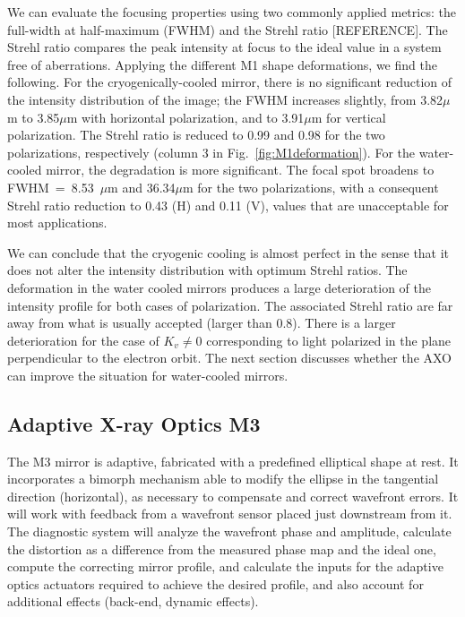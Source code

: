 \documentclass[preprint]{iucr}
\begin{document}
We can evaluate the focusing properties using two commonly applied metrics: the full-width at half-maximum (FWHM) and the Strehl ratio [REFERENCE]. The Strehl ratio compares the peak intensity at focus to the ideal value in a system free of aberrations. Applying the different M1 shape deformations, we find the following. For the cryogenically-cooled mirror, there is no significant reduction of the intensity distribution of the image; the FWHM increases slightly, from 3.82$\mu$m to 3.85$\mu$m with horizontal polarization, and to 3.91$\mu$m for vertical polarization. The Strehl ratio is reduced to 0.99 and 0.98 for the two polarizations, respectively (column 3 in Fig.~\ref{fig:M1deformation}). For the water-cooled mirror, the degradation is more significant. The focal spot broadens to FWHM~=~8.53~$\mu$m and 36.34$\mu$m for the two polarizations, with a consequent Strehl ratio reduction to 0.43 (H) and 0.11 (V), values that are unacceptable for most applications. 

We can conclude that the cryogenic cooling is almost perfect in the sense that it does not alter the intensity distribution with optimum Strehl ratios. The deformation in the water cooled mirrors produces a large deterioration of the intensity profile for both cases of polarization. The associated Strehl ratio are far away from what is usually accepted (larger than 0.8). There is a larger deterioration for the case of $K_v\ne 0$ corresponding to light polarized in the plane perpendicular to the electron orbit. The next section discusses whether the AXO can improve the situation for water-cooled mirrors.    

\subsection{Adaptive X-ray Optics M3}

The M3 mirror is adaptive, fabricated with a predefined elliptical shape at rest. It incorporates a bimorph mechanism able to modify the ellipse in the tangential direction (horizontal), as necessary to compensate and correct wavefront errors. It will work with feedback from a wavefront sensor placed just downstream from it. The diagnostic system will analyze the wavefront phase and amplitude, calculate the distortion as a difference from the measured phase map and the ideal one, compute the correcting mirror profile, and calculate the inputs for the adaptive optics actuators required to achieve the desired profile, and also account for additional effects (back-end, dynamic effects).
\end{document}

